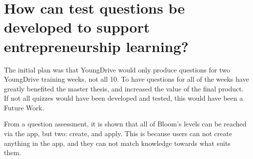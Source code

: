 
\section{How can test questions be developed to support entrepreneurship learning?} %


  The initial plan was that YoungDrive would only produce questions for two YoungDrive training weeks, not all 10. To have questions for all of the weeks have greatly benefited the master thesis, and increased the value of the final product. If not all quizzes would have been developed and tested, this would have been a Future Work.

  From a question assessment, it is shown that all of Bloom's levels can be reached via the app, but two: create, and apply. This is because users can not create anything in the app, and they can not match knowledge towards what suits them.
